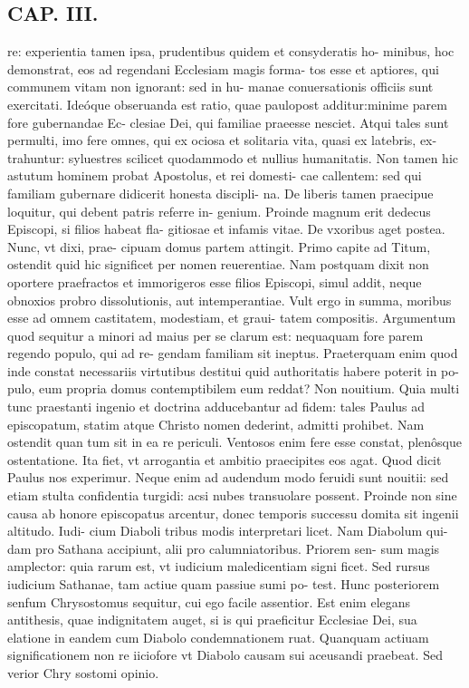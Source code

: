 \documentclass{article}
\begin{document}
\begin{pages}
\section*{CAP. III. }
\marginpar{[ p.34 ]}\pstart re: experientia tamen ipsa, prudentibus quidem et consyderatis ho- minibus, hoc demonstrat, eos ad regendani Ecclesiam magis forma- tos esse et aptiores, qui communem vitam non ignorant: sed in hu- manae conuersationis officiis sunt exercitati. Ideóque obseruanda est ratio, quae paulopost additur:minime parem fore gubernandae Ec- clesiae Dei, qui familiae praeesse nesciet. Atqui tales sunt permulti, imo fere omnes, qui ex ociosa et solitaria vita, quasi ex latebris, ex- trahuntur: syluestres scilicet quodammodo et nullius humanitatis. Non tamen hic astutum hominem probat Apostolus, et rei domesti- cae callentem: sed qui familiam gubernare didicerit honesta discipli- na. De liberis tamen praecipue loquitur, qui debent patris referre in- genium. Proinde magnum erit dedecus Episcopi, si filios habeat fla- gitiosae et infamis vitae. De vxoribus aget postea. Nunc, vt dixi, prae- cipuam domus partem attingit. Primo capite ad Titum, ostendit quid hic significet per nomen reuerentiae. Nam postquam dixit non oportere praefractos et immorigeros esse filios Episcopi, simul addit, neque obnoxios probro dissolutionis, aut intemperantiae. Vult ergo in summa, moribus esse ad omnem castitatem, modestiam, et graui- tatem compositis. Argumentum quod sequitur a minori ad maius per se clarum est: nequaquam fore parem regendo populo, qui ad re- gendam familiam sit ineptus. Praeterquam enim quod inde constat necessariis virtutibus destitui quid authoritatis habere poterit in po- pulo, eum propria domus contemptibilem eum reddat?  \pend\pstart Non nouitium. Quia multi tunc praestanti ingenio et doctrina adducebantur ad fidem: tales Paulus ad episcopatum, statim atque Christo nomen dederint, admitti prohibet. Nam ostendit quan tum sit in ea re periculi. Ventosos enim fere esse constat, plenôsque ostentatione. Ita fiet, vt arrogantia et ambitio praecipites eos agat. Quod dicit Paulus nos experimur. Neque enim ad audendum modo feruidi sunt nouitii: sed etiam stulta confidentia turgidi: acsi nubes transuolare possent. Proinde non sine causa ab honore episcopatus arcentur, donec temporis successu domita sit ingenii altitudo. Iudi- cium Diaboli tribus modis interpretari licet. Nam Diabolum qui- dam pro Sathana accipiunt, alii pro calumniatoribus. Priorem sen- sum magis amplector: quia rarum est, vt iudicium maledicentiam signi ficet. Sed rursus iudicium Sathanae, tam actiue quam passiue sumi po- test. Hunc posteriorem senfum Chrysostomus sequitur, cui ego facile assentior. Est enim elegans antithesis, quae indignitatem auget, si is qui praeficitur Ecclesiae Dei, sua elatione in eandem cum Diabolo condemnationem ruat. Quanquam actiuam significationem non re iiciofore vt Diabolo causam sui aceusandi praebeat. Sed verior Chry sostomi opinio.  \pend

\end{pages}
\end{document}
